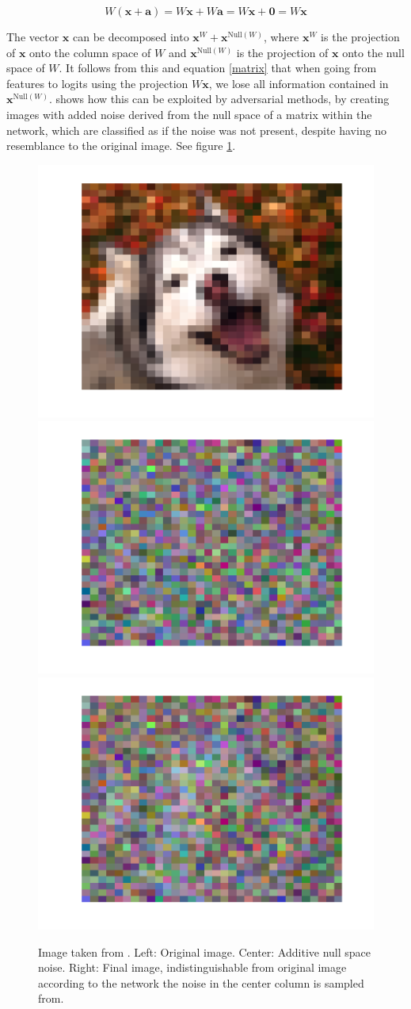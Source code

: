 \documentclass[conference,onecolumn]{IEEEtran}
\begin{document}
\begin{equation}
W (\bm{x} + \bm{a}) = W \bm{x} + W \bm{a} = W \bm{x} + \bm{0} = W \bm{x}
\label{matrix}
\end{equation}

The vector $\bm{x}$ can be decomposed into $\bm{x}^W + \bm{x}^{\text{Null}(W)}$, where $\bm{x}^W$ is the projection of $\bm{x}$ onto the column space of $W$ and $\bm{x}^{\text{Null}(W)}$ is the projection of $\bm{x}$ onto the null space of $W$. It follows from this and equation \ref{matrix} that when going from features to logits using the projection $W \bm{x}$, we lose all information contained in $\bm{x}^{\text{Null}(W)}$. \cite{nusa} shows how this can be exploited by adversarial methods, by creating images with added noise derived from the null space of a matrix within the network, which are classified as if the noise was not present, despite having no resemblance to the original image. See figure \ref{dog}.

\begin{figure}[hbt]
    \centering
    \includegraphics[width=0.32\linewidth,trim={1.25cm 1.25cm 1.25cm 1.25cm},clip]{figure/OrigImage.pdf}
    \includegraphics[width=0.32\linewidth,trim={1.25cm 1.25cm 1.25cm 1.25cm},clip]{figure/PureNoise.pdf}
    \includegraphics[width=0.32\linewidth,trim={1.25cm 1.25cm 1.25cm 1.25cm},clip]{figure/NoiseAdded.pdf}
    \caption{Image taken from \cite{nusa}. Left: Original image. Center: Additive null space noise. Right: Final image, indistinguishable from original image according to the network the noise in the center column is sampled from.}
    \label{dog}
\end{figure}
\end{document}
